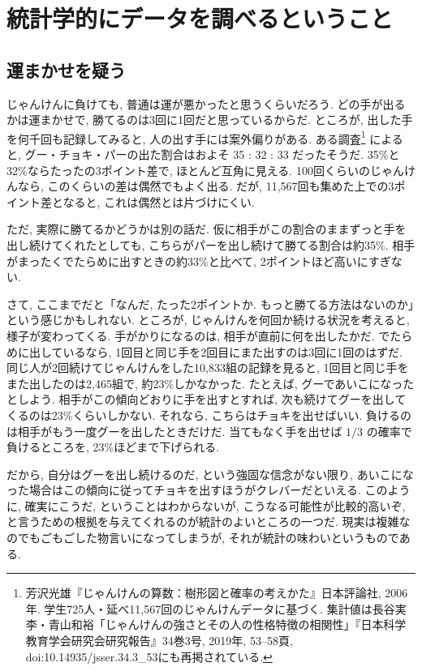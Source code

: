 \section{統計学的にデータを調べるということ}

  \subsection{運まかせを疑う}

    じゃんけんに負けても, 普通は運が悪かったと思うくらいだろう.
    どの手が出るかは運まかせで, 勝てるのは3回に1回だと思っているからだ.
    ところが, 出した手を何千回も記録してみると, 人の出す手には案外偏りがある.
    ある調査\footnote{%
    芳沢光雄『じゃんけんの算数：樹形図と確率の考えかた』日本評論社, 2006年.
    学生725人・延べ11{,}567回のじゃんけんデータに基づく.
    集計値は長谷実李・青山和裕「じゃんけんの強さとその人の性格特徴の相関性」『日本科学教育学会研究会研究報告』34巻3号, 2019年, 53--58頁, doi:10.14935/jsser.34.3\_53にも再掲されている.}
    によると, グー・チョキ・パーの出た割合はおよそ 35 : 32 : 33 だったそうだ.
    35\%と32\%ならたったの3ポイント差で, ほとんど互角に見える.
    100回くらいのじゃんけんなら, このくらいの差は偶然でもよく出る.
    だが, 11{,}567回も集めた上での3ポイント差となると, これは偶然とは片づけにくい.

    ただ, 実際に勝てるかどうかは別の話だ.
    仮に相手がこの割合のままずっと手を出し続けてくれたとしても, こちらがパーを出し続けて勝てる割合は約35\%.
    相手がまったくでたらめに出すときの約33\%と比べて, 2ポイントほど高いにすぎない.

    さて, ここまでだと「なんだ, たった2ポイントか. もっと勝てる方法はないのか」という感じかもしれない.
    ところが, じゃんけんを何回か続ける状況を考えると, 様子が変わってくる.
    手がかりになるのは, 相手が直前に何を出したかだ.
    でたらめに出しているなら, 1回目と同じ手を2回目にまた出すのは3回に1回のはずだ.
    同じ人が2回続けてじゃんけんをした10{,}833組の記録を見ると, 1回目と同じ手をまた出したのは2{,}465組で, 約23\%しかなかった.
    たとえば, グーであいこになったとしよう.
    相手がこの傾向どおりに手を出すとすれば, 次も続けてグーを出してくるのは23\%くらいしかない.
    それなら, こちらはチョキを出せばいい.
    負けるのは相手がもう一度グーを出したときだけだ.
    当てもなく手を出せば $1/3$ の確率で負けるところを, 23\%ほどまで下げられる.

    だから, 自分はグーを出し続けるのだ, という強固な信念がない限り, あいこになった場合はこの傾向に従ってチョキを出すほうがクレバーだといえる.
    このように, 確実にこうだ, ということはわからないが, こうなる可能性が比較的高いぞ, と言うための根拠を与えてくれるのが統計のよいところの一つだ.
    現実は複雑なのでもごもごした物言いになってしまうが, それが統計の味わいというものである.

